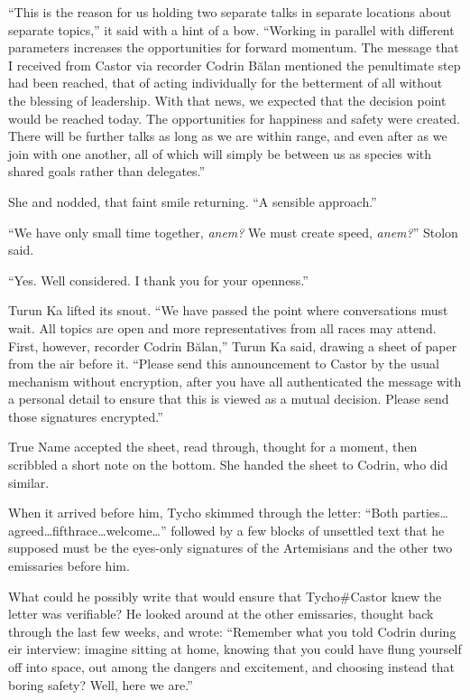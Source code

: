 ``This is the reason for us holding two separate talks in separate locations about separate topics,'' it said with a hint of a bow. ``Working in parallel with different parameters increases the opportunities for forward momentum. The message that I received from Castor via recorder Codrin Bălan mentioned the penultimate step had been reached, that of acting individually for the betterment of all without the blessing of leadership. With that news, we expected that the decision point would be reached today. The opportunities for happiness and safety were created. There will be further talks as long as we are within range, and even after as we join with one another, all of which will simply be between us as species with shared goals rather than delegates.''

She and nodded, that faint smile returning. ``A sensible approach.''

``We have only small time together, \emph{anem?} We must create speed, \emph{anem?}'' Stolon said.

``Yes. Well considered. I thank you for your openness.''

Turun Ka lifted its snout. ``We have passed the point where conversations must wait. All topics are open and more representatives from all races may attend. First, however, recorder Codrin Bălan,'' Turun Ka said, drawing a sheet of paper from the air before it. ``Please send this announcement to Castor by the usual mechanism without encryption, after you have all authenticated the message with a personal detail to ensure that this is viewed as a mutual decision. Please send those signatures encrypted.''

True Name accepted the sheet, read through, thought for a moment, then scribbled a short note on the bottom. She handed the sheet to Codrin, who did similar.

When it arrived before him, Tycho skimmed through the letter: ``Both parties\ldots agreed\ldots fifthrace\ldots welcome\ldots{}'' followed by a few blocks of unsettled text that he supposed must be the eyes-only signatures of the Artemisians and the other two emissaries before him.

What could he possibly write that would ensure that Tycho\#Castor knew the letter was verifiable? He looked around at the other emissaries, thought back through the last few weeks, and wrote: ``Remember what you told Codrin during eir interview: imagine sitting at home, knowing that you could have flung yourself off into space, out among the dangers and excitement, and choosing instead that boring safety? Well, here we are.''

